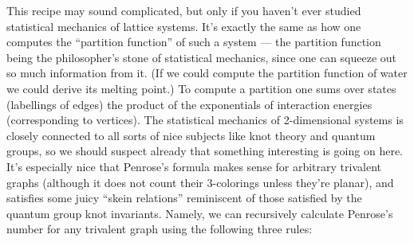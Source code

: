 \documentclass{article}
\begin{document}
This recipe may sound complicated, but only if you haven't ever studied
statistical mechanics of lattice systems. It's exactly the same as how
one computes the ``partition function'' of such a system --- the
partition function being the philosopher's stone of statistical
mechanics, since one can squeeze out so much information from it. (If we
could compute the partition function of water we could derive its
melting point.) To compute a partition one sums over states (labellings
of edges) the product of the exponentials of interaction energies
(corresponding to vertices). The statistical mechanics of 2-dimensional
systems is closely connected to all sorts of nice subjects like knot
theory and quantum groups, so we should suspect already that something
interesting is going on here. It's especially nice that Penrose's
formula makes sense for arbitrary trivalent graphs (although it does not
count their 3-colorings unless they're planar), and satisfies some juicy
``skein relations'' reminiscent of those satisfied by the quantum group
knot invariants. Namely, we can recursively calculate Penrose's number
for any trivalent graph using the following three rules:
\end{document}
